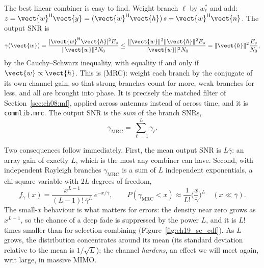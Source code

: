 
The best linear combiner is easy to find. Weight branch $\ell$ by $w_\ell^*$ and add:
$z=\vect{w}^{\mathsf H}\vect{y}=(\vect{w}^{\mathsf H}\vect{h})\,s+\vect{w}^{\mathsf H}\vect{n}$. The
output SNR is
\begin{equation}
\gamma(\vect{w})=\frac{|\vect{w}^{\mathsf H}\vect{h}|^2E_s}{\|\vect{w}\|^2N_0}
\le\frac{\|\vect{w}\|^2\|\vect{h}\|^2E_s}{\|\vect{w}\|^2N_0}=\|\vect{h}\|^2\frac{E_s}{N_0},
\label{eq:ch19:mrcsnr}
\end{equation}
by the Cauchy--Schwarz inequality, with equality if and only if $\vect{w}\propto\vect{h}$. This is
 (MRC): weight each branch by the conjugate of its own channel gain,
so that strong branches count for more, weak branches for less, and all are brought into phase.
It is precisely the matched filter of Section~\ref{sec:ch08:mf}, applied across antennas instead of
across time, and it is \texttt{commlib.mrc}. The output SNR is the \emph{sum} of the branch SNRs,
\begin{equation}
\gamma_{\text{MRC}}=\sum_{\ell=1}^L\gamma_\ell .
\label{eq:ch19:mrcsum}
\end{equation}

Two consequences follow immediately. First, the mean output SNR is $L\bar\gamma$: an array gain of
exactly $L$, which is the most any combiner can have. Second, with independent Rayleigh branches
$\gamma_{\text{MRC}}$ is a sum of $L$ independent exponentials, a chi-square variable with $2L$
degrees of freedom,
\begin{equation}
f_\gamma(x)=\frac{x^{L-1}}{(L-1)!\,\bar\gamma^L}\,e^{-x/\bar\gamma},
\qquad
P(\gamma_{\text{MRC}}<x)\approx\frac{1}{L!}\Big(\frac{x}{\bar\gamma}\Big)^L\quad(x\ll\bar\gamma).
\label{eq:ch19:chisq}
\end{equation}
The small-$x$ behaviour is what matters for errors: the density near zero grows as $x^{L-1}$, so
the chance of a deep fade is suppressed by the power $L$, and it is $L!$ times smaller than for
selection combining (Figure~\ref{fig:ch19_sc_cdf}). As $L$ grows, the distribution concentrates
around its mean (its standard deviation relative to the mean is $1/\sqrt{L}$); the channel
\emph{hardens}, an effect we will meet again, writ large, in massive MIMO.

